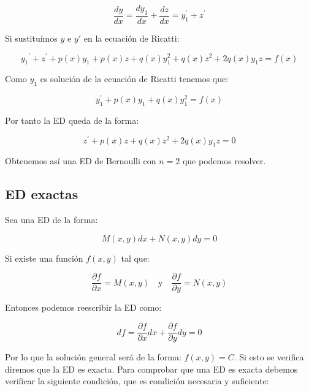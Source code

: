 \documentclass[a4paper,12pt,titlepage]{article}
\begin{document}
\begin{equation*}
    \frac{dy}{dx} = \frac{dy_1}{dx} + \frac{dz}{dx} = y_1^{\prime} + z^\prime
\end{equation*}

Si sustituímos $y$ e $y\prime$ en la ecuación de Ricatti:

\begin{equation*}
    y_1{^\prime} + z^\prime + p(x)y_1 + p(x)z + q(x)y_1^2 + q(x)z^2 + 2q(x)y_1z=f(x)
\end{equation*}

Como $y_1$ es solución de la ecuación de Ricatti tenemos que:

\begin{equation*}
    y_1^{\prime} +p(x)y_1 + q(x)y_1^2 = f(x)
\end{equation*}

Por tanto la ED queda de la forma:

\begin{equation*}
    z^\prime + p(x)z + q(x)z^2 + 2q(x)y_1z = 0
\end{equation*}

Obtenemos así una ED de Bernoulli con $n=2$ que podemos resolver.

\subsection{ED exactas}

Sea una ED de la forma:

\begin{equation*}
    M(x,y)dx+ N(x,y)dy=0
\end{equation*}

Si existe una función $f(x,y)$ tal que:

\begin{equation*}
    \frac{\partial f}{\partial x} = M(x,y) \quad \text{y} \quad \frac{\partial f}{\partial y} = N(x,y)
\end{equation*}

Entonces podemos reescribir la ED como:

\begin{equation*}
    df = \frac{\partial f}{\partial x}dx + \frac{\partial f}{\partial y} dy =0
\end{equation*}

Por lo que la solución general será de la forma: $f(x,y)=C$. Si esto se verifica diremos que la ED es exacta. Para comprobar que una ED es exacta debemos verificar la siguiente condición, que es condición necesaria y suficiente:
\end{document}
